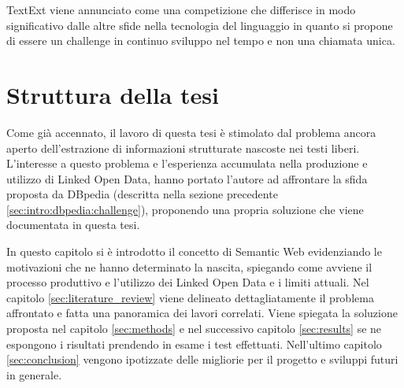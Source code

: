 TextExt viene annunciato come una competizione che differisce in modo significativo dalle altre sfide nella tecnologia del linguaggio in quanto si propone di essere un challenge in continuo sviluppo nel tempo e non una chiamata unica.





\section{Struttura della tesi}
\label{sec:intro:structure}

Come già accennato, il lavoro di questa tesi è stimolato dal problema ancora aperto dell'estrazione di informazioni strutturate nascoste nei testi liberi. 
L'interesse a questo problema e l'esperienza accumulata nella produzione e utilizzo di Linked Open Data, hanno portato l'autore ad affrontare la sfida proposta da DBpedia (descritta nella sezione precedente \ref{sec:intro:dbpedia:challenge}), proponendo una propria soluzione che viene documentata in questa tesi.

In questo capitolo si è introdotto il concetto di Semantic Web evidenziando le motivazioni che ne hanno determinato la nascita, spiegando come avviene il processo produttivo e l'utilizzo dei Linked Open Data e i limiti attuali. Nel capitolo \ref{sec:literature_review} viene delineato dettagliatamente il problema affrontato e fatta una panoramica dei lavori correlati. Viene spiegata la soluzione proposta nel capitolo \ref{sec:methods} e nel successivo capitolo \ref{sec:results} se ne espongono i risultati prendendo in esame i test effettuati. Nell'ultimo capitolo \ref{sec:conclusion} vengono ipotizzate delle migliorie per il progetto e sviluppi futuri in generale.




